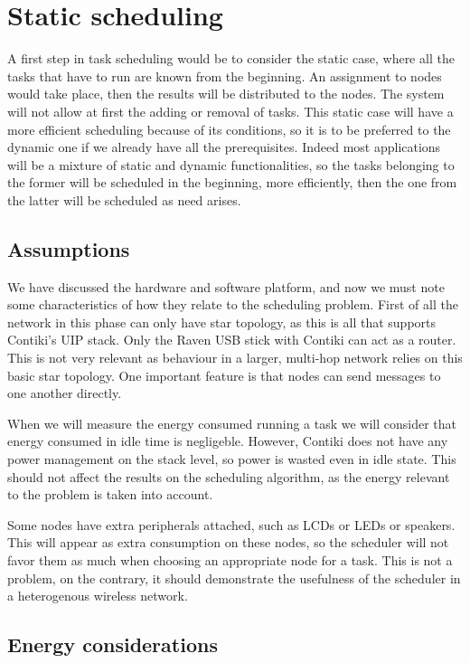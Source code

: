 \normalfont\normalsize

\chapter{Static scheduling}

A first step in task scheduling would be to consider the static case, where all the tasks that have to run are known from the beginning. An
assignment to nodes would take place, then the results will be distributed to the nodes. The system will not allow at first the adding
or removal of tasks. This static case will have a more efficient scheduling because of its conditions, so it is to be preferred to the dynamic
one if we already have all the prerequisites.  Indeed most applications will be a mixture of static and dynamic functionalities, so the tasks
belonging to the former will be scheduled in the beginning, more efficiently, then the one from the latter will be scheduled as need arises.

\section{Assumptions}

We have discussed the hardware and software platform, and now we must note some characteristics of how they relate to the scheduling problem.
First of all the network in this phase can only have star topology, as this is all that supports Contiki's UIP stack. Only the Raven USB stick 
with Contiki can act as a router. This is not very relevant as behaviour in a larger, multi-hop network relies on this basic star topology.  One
important feature is that nodes can send messages to one another directly. 

When we will measure the energy consumed running a task we will consider that energy consumed in idle time is negligeble. However, Contiki does not
have any power management on the stack level, so power is wasted even in idle state. This should not affect the results on the scheduling algorithm,
as the energy relevant to the problem is taken into account.

Some nodes have extra peripherals attached, such as LCDs or LEDs or speakers. This will appear as extra consumption on these nodes, so the scheduler
will not favor them as much when choosing an appropriate node for a task. This is not a problem, on the contrary, it should demonstrate the usefulness
of the scheduler in a heterogenous wireless network.

\section{Energy considerations}

